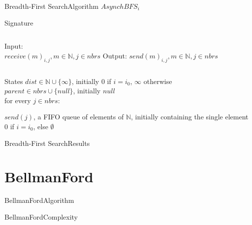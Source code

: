 \documentclass[pdf]{beamer}
\begin{document}
\begin{frame}{Breadth-First Search}{Algorithm}
	$AsynchBFS_i$
    \begin{block}{Signature}
        \begin{columns}
            Input:\\
            \hspace*{\parindent} $receive(m)_{i,j}, m \in \mathbb{N}, j \in nbrs$
            Output:
            \hspace*{\parindent} $send(m)_{i,j}, m \in \mathbb{N}, j \in nbrs$
        \end{columns}
    \end{block}
    \begin{block}{States}
        $dist \in \mathbb{N} \cup \{\infty\}$, initially $0$ if $i=i_0$, $\infty $ otherwise\\
        $parent \in nbrs \cup \{null\}$, initially $null$\\
        for every $j \in nbrs$:\\
        \hspace*{\parindent}
        \parbox{\textwidth}{
            $send(j)$, a FIFO queue of elements of $\mathbb{N}$, initially containing the single element $0$ if $i=i_0$, else $\emptyset$}
    \end{block}
	
\end{frame}

\begin{frame}{Breadth-First Search}{Results}
	
	
\end{frame}

\section{BellmanFord}
\begin{frame}{BellmanFord}{Algorithm}
	
	
\end{frame}
\begin{frame}{BellmanFord}{Complexity}
	
	
\end{frame}
\end{document}
